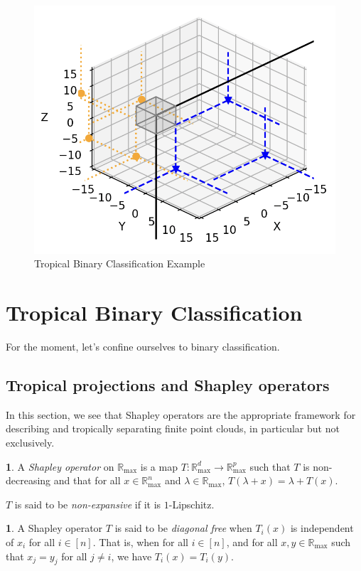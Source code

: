 \documentclass[oneside,english]{amsart}
\numberwithin{equation}{section}
\numberwithin{figure}{section}
\theoremstyle{plain}
\theoremstyle{definition}
\newtheorem{defn}[thm]{\protect\definitionname}
\theoremstyle{plain}
\theoremstyle{remark}
\theoremstyle{plain}
\theoremstyle{definition}
\theoremstyle{definition}
\providecommand{\definitionname}{Definition}
\begin{document}
\begin{figure}[!h]
\includegraphics[scale=0.8]{fig/illustration.png} \caption{Tropical Binary Classification Example}
\end{figure}


\section{Tropical Binary Classification}

For the moment, let's confine ourselves to binary classification.

\subsection{Tropical projections and Shapley operators}

In this section, we see that Shapley operators are the appropriate
framework for describing and tropically separating finite point clouds,
in particular but not exclusively.
\begin{defn}
A \emph{Shapley operator} on $\mathbb{R}_{\max}$ is a map $T:\mathbb{R}_{\max}^{d}\longrightarrow\mathbb{R}_{\max}^{p}$
such that $T$ is non-decreasing and that for all $x\in\mathbb{R}_{\max}^{n}$
and $\lambda\in\mathbb{R}_{\max}$, $T(\lambda+x)=\lambda+T(x)$.

$T$ is said to be \emph{non-expansive }if it is $1$-Lipschitz. 
\end{defn}

\begin{defn}
A Shapley operator $T$ is said to be \emph{diagonal free} when $T_{i}(x)$
is independent of $x_{i}$ for all $i\in[n]$. That is, when for all
$i\in[n]$, and for all $x,y\in\mathbb{R}_{\max}$ such that $x_{j}=y_{j}$
for all $j\neq i$, we have $T_{i}(x)=T_{i}(y)$. 
\end{defn}
\end{document}
